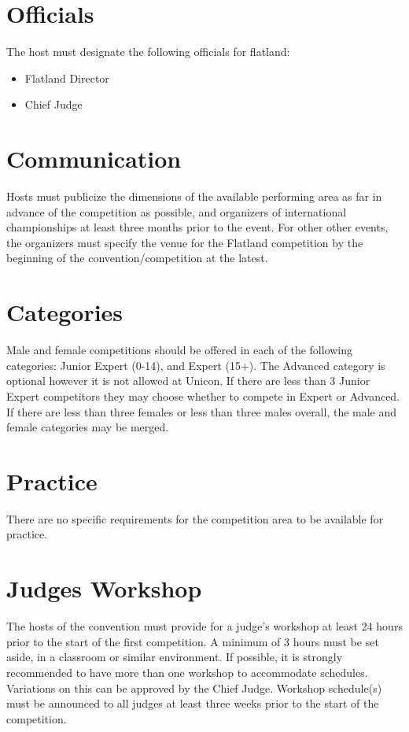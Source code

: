 \section{Officials}

The host must designate the following officials for flatland:
\begin{itemize}
\item Flatland Director
\item Chief Judge
\end{itemize}

\section{Communication}

Hosts must publicize the dimensions of the available performing area as far in advance of the competition as possible, and organizers of international championships at least three months prior to the event.
For other other events, the organizers must specify the venue for the Flatland competition by the beginning of the convention/competition at the latest.

\section{Categories}
Male and female competitions should be offered in each of the following categories: Junior Expert (0-14), and Expert (15+).
The Advanced category is optional however it is not allowed at Unicon.
If there are less than 3 Junior Expert competitors they may choose whether to compete in Expert or Advanced.
If there are less than three females or less than three males overall, the male and female categories may be merged.

\section{Practice}

There are no specific requirements for the competition area to be available for practice.

\section{Judges Workshop}
The hosts of the convention must provide for a judge's workshop at least 24 hours prior to the start of the first competition.
A minimum of 3 hours must be set aside, in a classroom or similar environment.
If possible, it is strongly recommended to have more than one workshop to accommodate schedules.
Variations on this can be approved by the Chief Judge.
Workshop schedule(s) must be announced to all judges at least three weeks prior to the start of the competition.
